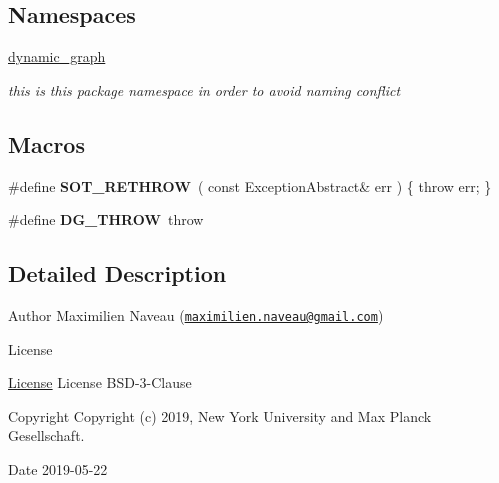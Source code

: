 \subsection*{Namespaces}
\begin{DoxyCompactItemize}
\item 
 \hyperlink{namespacedynamic__graph}{dynamic\+\_\+graph}
\begin{DoxyCompactList}\small\item\em this is this package namespace in order to avoid naming conflict \end{DoxyCompactList}\end{DoxyCompactItemize}
\subsection*{Macros}
\begin{DoxyCompactItemize}
\item 
\#define {\bfseries S\+O\+T\+\_\+\+R\+E\+T\+H\+R\+OW}~( const Exception\+Abstract\& err ) \{ throw err; \}\hypertarget{exception-abstract_8hh_aba67729ca33a61234a4ca01d1e070125}{}\label{exception-abstract_8hh_aba67729ca33a61234a4ca01d1e070125}

\item 
\#define {\bfseries D\+G\+\_\+\+T\+H\+R\+OW}~throw\hypertarget{exception-abstract_8hh_af37158a4ed07567f1673457ea2656a34}{}\label{exception-abstract_8hh_af37158a4ed07567f1673457ea2656a34}

\end{DoxyCompactItemize}


\subsection{Detailed Description}
\begin{DoxyAuthor}{Author}
Maximilien Naveau (\href{mailto:maximilien.naveau@gmail.com}{\tt maximilien.\+naveau@gmail.\+com}) 
\end{DoxyAuthor}
\begin{DoxyRefDesc}{License}
\item[\hyperlink{license__license000006}{License}]License B\+S\+D-\/3-\/\+Clause \end{DoxyRefDesc}
\begin{DoxyCopyright}{Copyright}
Copyright (c) 2019, New York University and Max Planck Gesellschaft. 
\end{DoxyCopyright}
\begin{DoxyDate}{Date}
2019-\/05-\/22 
\end{DoxyDate}
